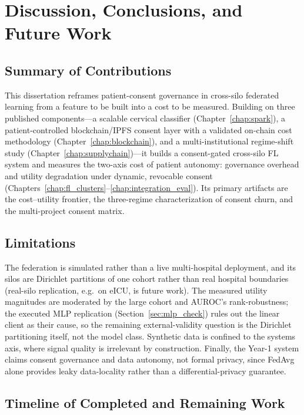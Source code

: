\documentclass[12pt]{report}
\begin{document}
\chapter{Discussion, Conclusions, and Future Work}
\label{chap:conclusion}

\section{Summary of Contributions}
This dissertation reframes patient-consent governance in cross-silo federated
learning from a feature to be built into a cost to be measured. Building on three
published components---a scalable cervical classifier
(Chapter~\ref{chap:spark}), a patient-controlled blockchain/IPFS consent layer
with a validated on-chain cost methodology (Chapter~\ref{chap:blockchain}), and a
multi-institutional regime-shift study (Chapter~\ref{chap:supplychain})---it builds
a consent-gated cross-silo FL system and measures the two-axis cost of patient
autonomy: governance overhead and utility degradation under dynamic, revocable
consent (Chapters~\ref{chap:fl_clusters}--\ref{chap:integration_eval}). Its primary
artifacts are the cost--utility frontier, the three-regime characterization of
consent churn, and the multi-project consent matrix.

\section{Limitations}
The federation is simulated rather than a live multi-hospital deployment, and
its silos are Dirichlet partitions of one cohort rather than real hospital
boundaries (real-silo replication, e.g.\ on eICU, is future work). The measured
utility magnitudes are moderated by the large cohort and AUROC's
rank-robustness; the executed MLP replication (Section~\ref{sec:mlp_check})
rules out the linear client as their cause, so the remaining external-validity
question is the Dirichlet partitioning itself, not the model class. Synthetic
data is confined to the systems axis,
where signal quality is irrelevant by construction. Finally, the Year-1 system
claims consent
governance and data autonomy, not formal privacy, since FedAvg alone provides
leaky data-locality rather than a differential-privacy guarantee.

\section{Timeline of Completed and Remaining Work}
\label{sec:timeline}
\end{document}
